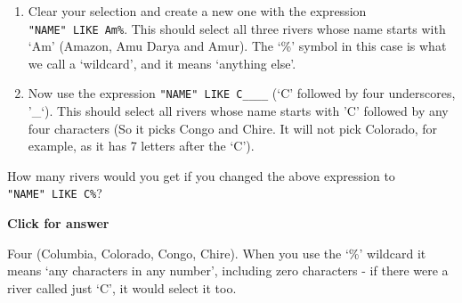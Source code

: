 \documentclass[
  letterpaper,
  DIV=11,
  numbers=noendperiod]{scrreprt}
\begin{document}
\begin{enumerate}
\def\labelenumi{(\arabic{enumi})}
\setcounter{enumi}{91}
\item
  Clear your selection and create a new one with the expression
  \texttt{"NAME"\ LIKE\ \textquotesingle{}Am\%\textquotesingle{}}. This
  should select all three rivers whose name starts with `Am' (Amazon,
  Amu Darya and Amur). The `\%' symbol in this case is what we call a
  `wildcard', and it means `anything else'.
\item
  Now use the expression
  \texttt{"NAME"\ LIKE\ \textquotesingle{}C\_\_\_\_\textquotesingle{}}
  (`C' followed by four underscores, '\_`). This should select all
  rivers whose name starts with 'C' followed by any four characters (So
  it picks Congo and Chire. It will not pick Colorado, for example, as
  it has 7 letters after the `C').
\end{enumerate}

\begin{tcolorbox}[enhanced jigsaw, breakable, toptitle=1mm, colback=white, left=2mm, leftrule=.75mm, titlerule=0mm, colframe=quarto-callout-important-color-frame, opacityback=0, title=\textcolor{quarto-callout-important-color}{\faExclamation}\hspace{0.5em}{Stop and Think}, toprule=.15mm, opacitybacktitle=0.6, bottomtitle=1mm, colbacktitle=quarto-callout-important-color!10!white, bottomrule=.15mm, coltitle=black, rightrule=.15mm, arc=.35mm]

How many rivers would you get if you changed the above expression to
\texttt{"NAME"\ LIKE\ \textquotesingle{}C\%\textquotesingle{}}?

\end{tcolorbox}

\begin{tcolorbox}[enhanced jigsaw, leftrule=.75mm, colframe=quarto-callout-important-color-frame, breakable, toprule=.15mm, bottomrule=.15mm, arc=.35mm, rightrule=.15mm, opacityback=0, colback=white, left=2mm]

\vspace{-3mm}\textbf{Click for answer}\vspace{3mm}

Four (Columbia, Colorado, Congo, Chire). When you use the `\%' wildcard
it means `any characters in any number', including zero characters - if
there were a river called just `C', it would select it too.

\end{tcolorbox}
\end{document}
